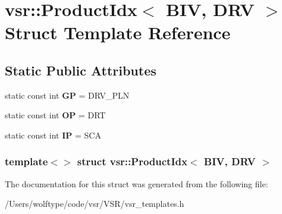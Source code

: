 \hypertarget{structvsr_1_1_product_idx_3_01_b_i_v_00_01_d_r_v_01_4}{\section{vsr\-:\-:Product\-Idx$<$ B\-I\-V, D\-R\-V $>$ Struct Template Reference}
\label{structvsr_1_1_product_idx_3_01_b_i_v_00_01_d_r_v_01_4}
}
\subsection*{Static Public Attributes}
\begin{DoxyCompactItemize}
\item 
\hypertarget{structvsr_1_1_product_idx_3_01_b_i_v_00_01_d_r_v_01_4_af82d536e038b35b0afd2ba8c45cdea5d}{static const int {\bfseries G\-P} = D\-R\-V\-\_\-\-P\-L\-N}\label{structvsr_1_1_product_idx_3_01_b_i_v_00_01_d_r_v_01_4_af82d536e038b35b0afd2ba8c45cdea5d}

\item 
\hypertarget{structvsr_1_1_product_idx_3_01_b_i_v_00_01_d_r_v_01_4_ab4e7db1ad6d44198ffef90545ec40e5d}{static const int {\bfseries O\-P} = D\-R\-T}\label{structvsr_1_1_product_idx_3_01_b_i_v_00_01_d_r_v_01_4_ab4e7db1ad6d44198ffef90545ec40e5d}

\item 
\hypertarget{structvsr_1_1_product_idx_3_01_b_i_v_00_01_d_r_v_01_4_a808a9ec9028612e595a014ff1a235a02}{static const int {\bfseries I\-P} = S\-C\-A}\label{structvsr_1_1_product_idx_3_01_b_i_v_00_01_d_r_v_01_4_a808a9ec9028612e595a014ff1a235a02}

\end{DoxyCompactItemize}
\subsubsection*{template$<$$>$ struct vsr\-::\-Product\-Idx$<$ B\-I\-V, D\-R\-V $>$}



The documentation for this struct was generated from the following file\-:\begin{DoxyCompactItemize}
\item 
/\-Users/wolftype/code/vsr/\-V\-S\-R/vsr\-\_\-templates.\-h\end{DoxyCompactItemize}
